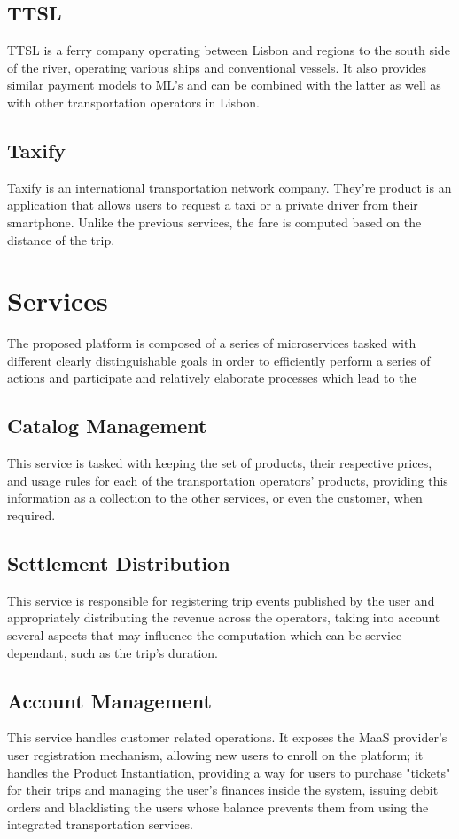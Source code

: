 \documentclass[runningheads,a4]{llncs}
\begin{document}
\subsection{\acl{TTSL}}
\label{sec:entities.transtejo}
\acl{TTSL} is a ferry company operating between Lisbon and regions to the south
side of the river, operating various ships and conventional vessels. It also
provides similar payment models to \ac{ML}'s and can be combined with the latter
as well as with other transportation operators in Lisbon.

\subsection{Taxify}
\label{sec:entities.taxify}
Taxify is an international transportation network company. They're product is an
application that allows users to request a taxi or a private driver from their
smartphone. Unlike the previous services, the fare is computed based on the
distance of the trip.


\section{Services}
\label{sec:services}
The proposed platform is composed of a series of microservices tasked with
different clearly distinguishable goals in order to efficiently perform a
series of actions and participate and relatively elaborate processes which lead
to the 

\subsection{Catalog Management}
\label{sec:services.catalog}
This service is tasked with keeping the set of products, their respective
prices, and usage rules for each of the transportation operators' products,
providing this information as a collection to the other services, or even the
customer, when required.

\subsection{Settlement Distribution}
\label{sec:services.settle}
This service is responsible for registering trip events published by the user
and appropriately distributing the revenue across the operators, taking into
account several aspects that may influence the computation which can be service
dependant, such as the trip's duration.

\subsection{Account Management}
\label{sec:services.account}
This service handles customer related operations. It exposes the \ac{MaaS}
provider’s user registration mechanism, allowing new users to enroll on the
platform; it handles the Product Instantiation, providing a way for users to
purchase "tickets" for their trips and managing the user's finances inside the
system, issuing debit orders and blacklisting the users whose balance prevents
them from using the integrated transportation services.
\end{document}
